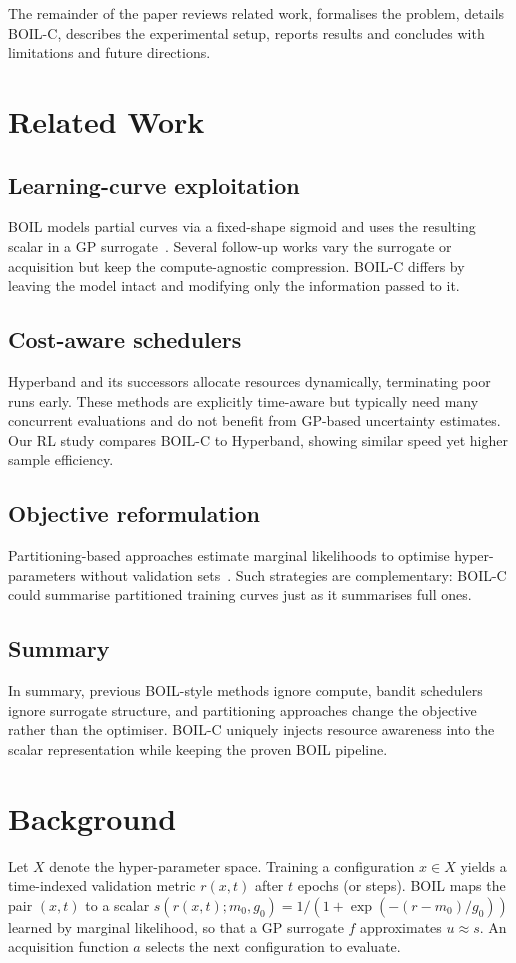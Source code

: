 \documentclass{article} %
\begin{document}
The remainder of the paper reviews related work, formalises the problem, details BOIL-C, describes the experimental setup, reports results and concludes with limitations and future directions.

\section{Related Work}
\label{sec:related}
\subsection{Learning-curve exploitation}
BOIL models partial curves via a fixed-shape sigmoid and uses the resulting scalar in a GP surrogate~\cite{nguyen-2019-bayesian}. Several follow-up works vary the surrogate or acquisition but keep the compute-agnostic compression. BOIL-C differs by leaving the model intact and modifying only the information passed to it.

\subsection{Cost-aware schedulers}
Hyperband and its successors allocate resources dynamically, terminating poor runs early. These methods are explicitly time-aware but typically need many concurrent evaluations and do not benefit from GP-based uncertainty estimates. Our RL study compares BOIL-C to Hyperband, showing similar speed yet higher sample efficiency.

\subsection{Objective reformulation}
Partitioning-based approaches estimate marginal likelihoods to optimise hyper-parameters without validation sets~\cite{mlodozeniec-2023-hyperparameter}. Such strategies are complementary: BOIL-C could summarise partitioned training curves just as it summarises full ones.

\subsection{Summary}
In summary, previous BOIL-style methods ignore compute, bandit schedulers ignore surrogate structure, and partitioning approaches change the objective rather than the optimiser. BOIL-C uniquely injects resource awareness into the scalar representation while keeping the proven BOIL pipeline.

\section{Background}
\label{sec:background}
Let \(X\) denote the hyper-parameter space. Training a configuration \(x\in X\) yields a time-indexed validation metric \(r(x,t)\) after \(t\) epochs (or steps). BOIL maps the pair \((x,t)\) to a scalar \(s(r(x,t);m_0,g_0)=1/(1+\exp(-(r-m_0)/g_0))\) learned by marginal likelihood, so that a GP surrogate \(f\) approximates \(u\approx s\). An acquisition function \(a\) selects the next configuration to evaluate.
\end{document}
